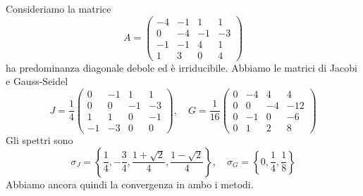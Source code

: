 \documentclass[a4paper]{article}
\begin{document}
\begin{snippetexample}{}
    Consideriamo la matrice
    \[
        A =
        \begin{pmatrix}
            -4 & -1 & 1 & 1 \\
            0 & -4 & -1 & -3 \\
            -1 & -1 & 4 & 1 \\
            1 & 3 & 0 & 4
        \end{pmatrix}
    \]
    ha predominanza diagonale debole ed è irriducibile.
    Abbiamo le matrici di Jacobi e Gauss-Seidel \[
        J = \frac14
        \begin{pmatrix}
            0 & -1 & 1 & 1 \\
            0 & 0 & -1 & -3 \\
            1 & 1 & 0 & -1 \\
            -1 & -3 & 0 & 0
        \end{pmatrix},
        \quad
        G = \frac{1}{16}
        \begin{pmatrix}
            0 & -4 & 4 & 4 \\
            0 & 0 & -4 & -12 \\
            0 & -1 & 0 & -6 \\
            0 & 1 & 2 & 8
        \end{pmatrix}
    \]
    Gli spettri sono
    \[
        \sigma_J = \left\{
            \frac14, -\frac34, \frac{1 + \sqrt{2}}{4}, \frac{1-\sqrt{2}}{4}
        \right\},
        \quad
        \sigma_G = \left\{
            0, \frac14, \frac18
        \right\}
    \]
    Abbiamo ancora quindi la convergenza in ambo i metodi.
\end{snippetexample}
\end{document}
